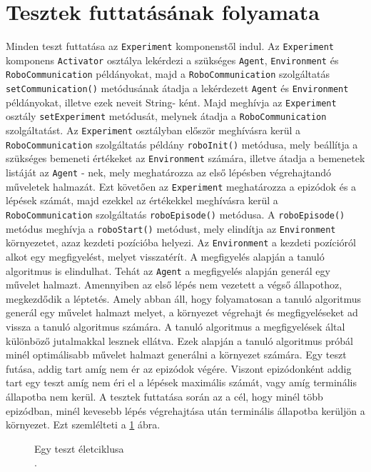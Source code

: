 \section{Tesztek futtatásának folyamata}\label{sec:TesztekFolyamata}
Minden teszt futtatása az \texttt{Experiment} komponenstől indul. Az \texttt{Experiment} komponens \texttt{Activator} osztálya lekérdezi a szükséges \texttt{Agent}, \texttt{Environment} és \texttt{RoboCommunication} példányokat, majd a \texttt{RoboCommunication} szolgáltatás \texttt{setCommunication()} metódusának átadja a lekérdezett \texttt{Agent} és \texttt{Environment} példányokat, illetve ezek neveit String- ként. Majd meghívja az \texttt{Experiment} osztály \texttt{setExperiment} metódusát, melynek átadja a \texttt{RoboCommunication} szolgáltatást. Az \texttt{Experiment} osztályban először meghívásra kerül a \texttt{RoboCommunication} szolgáltatás példány \texttt{roboInit()} metódusa, mely beállítja a szükséges bemeneti értékeket az \texttt{Environment} számára, illetve átadja a bemenetek listáját az \texttt{Agent} - nek, mely meghatározza az első lépésben végrehajtandó műveletek halmazát. Ezt követően az \texttt{Experiment} meghatározza a epizódok és a lépések számát, majd ezekkel az értékekkel meghívásra kerül a \texttt{RoboCommunication} szolgáltatás \texttt{roboEpisode()} metódusa. A \texttt{roboEpisode()} metódus meghívja a \texttt{roboStart()} metódust, mely elindítja az \texttt{Environment} környezetet, azaz kezdeti pozícióba helyezi. Az \texttt{Environment} a kezdeti pozícióról alkot egy megfigyelést, melyet visszatérít. A megfigyelés alapján a tanuló algoritmus is elindulhat. Tehát az \texttt{Agent} a megfigyelés alapján generál egy művelet halmazt. Amennyiben az első lépés nem vezetett a végső állapothoz, megkezdődik a léptetés. Amely abban áll, hogy folyamatosan a tanuló algoritmus generál egy művelet halmazt melyet, a környezet végrehajt és megfigyeléseket ad vissza a tanuló algoritmus számára. A tanuló algoritmus a megfigyelések által különböző jutalmakkal lesznek ellátva. Ezek alapján a tanuló algoritmus próbál minél optimálisabb művelet halmazt generálni a környezet számára. Egy teszt futása, addig tart amíg nem ér az epizódok végére. Viszont epizódonként addig tart egy teszt amíg nem éri el a lépések maximális számát, vagy amíg terminális állapotba nem kerül. A tesztek futtatása során az a cél, hogy minél több epizódban, minél kevesebb lépés végrehajtása után terminális állapotba kerüljön a környezet. Ezt szemlélteti a \ref{fig:szekvencia} ábra.


\begin{figure}[h!]
  \centering
  \caption[Egy teszt életciklusa]%
  {Egy teszt életciklusa\\
  {\white .}\hfill\url{}}
  \label{fig:szekvencia}
\end{figure}


 



